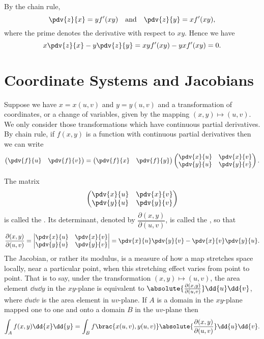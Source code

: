 \begin{solution}
By the chain rule,
\[ \pdv{z}{x}=yf^\prime(xy) \quad \text{and} \quad \pdv{z}{y}=xf^\prime(xy), \]
where the prime denotes the derivative with respect to $xy$. Hence we have
\[ x\pdv{z}{x}-y\pdv{z}{y}=xyf^\prime(xy)-yxf^\prime(xy)=0. \]
\end{solution}
\pagebreak

\section{Coordinate Systems and Jacobians}
Suppose we have $x=x(u,v)$ and $y=y(u,v)$ and a transformation of coordinates, or a change of variables, given by the mapping $(x,y)\mapsto(u,v)$. We only consider those transformations which have continuous partial derivatives. By chain rule, if $f(x,y)$ is a function with continuous partial derivatives then we can write
\begin{equation}
\begin{pmatrix}
\pdv{f}{u}&\pdv{f}{v}
\end{pmatrix}=
\begin{pmatrix}
\pdv{f}{x}&\pdv{f}{y}
\end{pmatrix}
\begin{pmatrix}
\pdv{x}{u}&\pdv{x}{v}\\
\pdv{y}{u}&\pdv{y}{v}
\end{pmatrix}.
\end{equation}

The matrix
\[\begin{pmatrix}
\pdv{x}{u}&\pdv{x}{v}\\
\pdv{y}{u}&\pdv{y}{v}
\end{pmatrix}\]
is called the . Its determinant, denoted by $\dfrac{\partial(x,y)}{\partial(u,v)}$, is called the , so that
\[\frac{\partial(x,y)}{\partial(u,v)}=\begin{vmatrix}
\pdv{x}{u}&\pdv{x}{v}\\
\pdv{y}{u}&\pdv{y}{v}
\end{vmatrix}=\pdv{x}{u}\pdv{y}{v}-\pdv{x}{v}\pdv{y}{u}.\]
The Jacobian, or rather its modulus, is a measure of how a map stretches space locally, near a particular point, when this stretching effect varies from point to point. That is to say, under the transformation $(x,y)\mapsto(u,v)$, the area element $\dd{u}\dd{y}$ in the $xy$-plane is equivalent to $\absolute{\frac{\partial(x,y)}{\partial(u,v)}}\dd{u}\dd{v}$, where $\dd{u}\dd{v}$ is the area element in $uv$-plane. If $A$ is a domain in the $xy$-plane mapped one to one and onto a domain $B$ in the $uv$-plane then
\[\int_Af(x,y)\dd{x}\dd{y}=\int_Bf\brac{x(u,v),y(u,v)}\absolute{\frac{\partial(x,y)}{\partial(u,v)}}\dd{u}\dd{v}.\]

